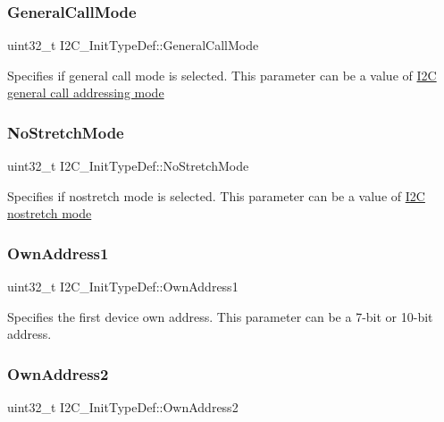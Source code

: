 \subsubsection{\texorpdfstring{General\+Call\+Mode}{GeneralCallMode}}
{\footnotesize\ttfamily uint32\+\_\+t I2\+C\+\_\+\+Init\+Type\+Def\+::\+General\+Call\+Mode}

Specifies if general call mode is selected. This parameter can be a value of \hyperlink{group___i2_c__general__call__addressing__mode}{I2C general call addressing mode} \mbox{\label{struct_i2_c___init_type_def_a28afdce458703464638f1a01e04da04e}} 
\subsubsection{\texorpdfstring{No\+Stretch\+Mode}{NoStretchMode}}
{\footnotesize\ttfamily uint32\+\_\+t I2\+C\+\_\+\+Init\+Type\+Def\+::\+No\+Stretch\+Mode}

Specifies if nostretch mode is selected. This parameter can be a value of \hyperlink{group___i2_c__nostretch__mode}{I2C nostretch mode} \mbox{\label{struct_i2_c___init_type_def_abfb610317ea08e85c8feece82ccc9e16}} 
\subsubsection{\texorpdfstring{Own\+Address1}{OwnAddress1}}
{\footnotesize\ttfamily uint32\+\_\+t I2\+C\+\_\+\+Init\+Type\+Def\+::\+Own\+Address1}

Specifies the first device own address. This parameter can be a 7-\/bit or 10-\/bit address. \mbox{\label{struct_i2_c___init_type_def_a8165caf61b7b52f903edd7517ddaa06b}} 
\subsubsection{\texorpdfstring{Own\+Address2}{OwnAddress2}}
{\footnotesize\ttfamily uint32\+\_\+t I2\+C\+\_\+\+Init\+Type\+Def\+::\+Own\+Address2}

